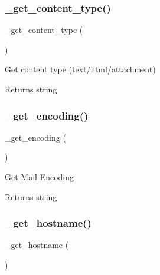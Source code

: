 \subsubsection{\texorpdfstring{\+\_\+get\+\_\+content\+\_\+type()}{\_get\_content\_type()}}
{\footnotesize\ttfamily \+\_\+get\+\_\+content\+\_\+type (\begin{DoxyParamCaption}{ }\end{DoxyParamCaption})\hspace{0.3cm}{\ttfamily [protected]}}

Get content type (text/html/attachment)

\begin{DoxyReturn}{Returns}
string 
\end{DoxyReturn}
\mbox{\label{class_c_i___email_ab7a90b9198c0384a2a330728f2c78ebd}} 
\subsubsection{\texorpdfstring{\+\_\+get\+\_\+encoding()}{\_get\_encoding()}}
{\footnotesize\ttfamily \+\_\+get\+\_\+encoding (\begin{DoxyParamCaption}{ }\end{DoxyParamCaption})\hspace{0.3cm}{\ttfamily [protected]}}

Get \mbox{\hyperlink{class_mail}{Mail}} Encoding

\begin{DoxyReturn}{Returns}
string 
\end{DoxyReturn}
\mbox{\label{class_c_i___email_ad2d333b7bb9f6c25400714dd8931fe11}} 
\subsubsection{\texorpdfstring{\+\_\+get\+\_\+hostname()}{\_get\_hostname()}}
{\footnotesize\ttfamily \+\_\+get\+\_\+hostname (\begin{DoxyParamCaption}{ }\end{DoxyParamCaption})\hspace{0.3cm}{\ttfamily [protected]}}

